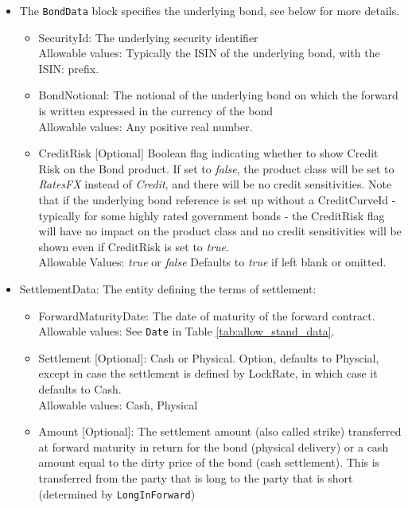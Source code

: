 \begin{itemize}
   \item The {\tt BondData} block specifies the underlying bond, see below for more details.
   \begin{itemize}
     \item SecurityId: The underlying security identifier \\    
        Allowable values:  Typically the ISIN of the underlying bond, with the ISIN: prefix. 
     \item BondNotional: The notional of the underlying bond on which the forward is written expressed in the currency of
       the bond \\
        Allowable values:  Any positive real number.
    \item CreditRisk [Optional] Boolean flag indicating whether to show Credit Risk on the Bond product. If set to \emph{false}, the product class will be set to \emph{RatesFX} instead of \emph{Credit}, and there will be no credit sensitivities. Note that if the underlying bond reference is set up without a CreditCurveId - typically for some highly rated government bonds -  the CreditRisk flag will have no impact on the product class and no credit sensitivities will be shown even if CreditRisk is set to \emph{true}.\\
  Allowable Values: \emph{true} or \emph{false} Defaults to \emph{true} if left blank or omitted.    
   \end{itemize}
   \item SettlementData: The entity defining the terms of settlement:
   \begin{itemize}
       \item ForwardMaturityDate: The date of maturity of the forward contract. \\
         Allowable values: See \lstinline!Date! in Table \ref{tab:allow_stand_data}.
       \item Settlement [Optional]: Cash or Physical. Option, defaults to Physcial, except in case the settlement is
         defined by LockRate, in which case it defaults to Cash. \\
         Allowable values: Cash, Physical
       \item Amount [Optional]: The settlement amount (also called strike) transferred at forward maturity in return for
         the bond (physical delivery) or a cash amount equal to the dirty price of the bond (cash settlement). This is
         transferred from the party that is long to the party that is short (determined by \lstinline!LongInForward!)

\end{itemize}
\end{itemize}
